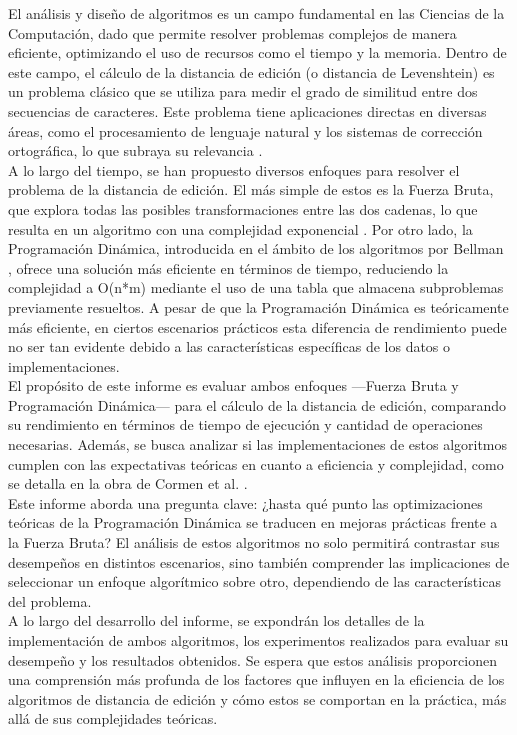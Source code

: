 El análisis y diseño de algoritmos es un campo fundamental en las Ciencias de la Computación, dado que permite resolver problemas complejos de manera eficiente, optimizando el uso de recursos como el tiempo y la memoria. Dentro de este campo, el cálculo de la distancia de edición (o distancia de Levenshtein) es un problema clásico que se utiliza para medir el grado de similitud entre dos secuencias de caracteres. Este problema tiene aplicaciones directas en diversas áreas, como el procesamiento de lenguaje natural y los sistemas de corrección ortográfica, lo que subraya su relevancia \cite{jurafsky2024}. \\

\noindent A lo largo del tiempo, se han propuesto diversos enfoques para resolver el problema de la distancia de edición. El más simple de estos es la Fuerza Bruta, que explora todas las posibles transformaciones entre las dos cadenas, lo que resulta en un algoritmo con una complejidad exponencial \cite{levenshtein1966}. Por otro lado, la Programación Dinámica, introducida en el ámbito de los algoritmos por Bellman \cite{bellman1957}, ofrece una solución más eficiente en términos de tiempo, reduciendo la complejidad a O(n*m) mediante el uso de una tabla que almacena subproblemas previamente resueltos. A pesar de que la Programación Dinámica es teóricamente más eficiente, en ciertos escenarios prácticos esta diferencia de rendimiento puede no ser tan evidente debido a las características específicas de los datos o implementaciones. \\

\noindent El propósito de este informe es evaluar ambos enfoques —Fuerza Bruta y Programación Dinámica— para el cálculo de la distancia de edición, comparando su rendimiento en términos de tiempo de ejecución y cantidad de operaciones necesarias. Además, se busca analizar si las implementaciones de estos algoritmos cumplen con las expectativas teóricas en cuanto a eficiencia y complejidad, como se detalla en la obra de Cormen et al. \cite{cormen2009}. \\

\noindent Este informe aborda una pregunta clave: ¿hasta qué punto las optimizaciones teóricas de la Programación Dinámica se traducen en mejoras prácticas frente a la Fuerza Bruta? El análisis de estos algoritmos no solo permitirá contrastar sus desempeños en distintos escenarios, sino también comprender las implicaciones de seleccionar un enfoque algorítmico sobre otro, dependiendo de las características del problema. \\

\noindent A lo largo del desarrollo del informe, se expondrán los detalles de la implementación de ambos algoritmos, los experimentos realizados para evaluar su desempeño y los resultados obtenidos. Se espera que estos análisis proporcionen una comprensión más profunda de los factores que influyen en la eficiencia de los algoritmos de distancia de edición y cómo estos se comportan en la práctica, más allá de sus complejidades teóricas.